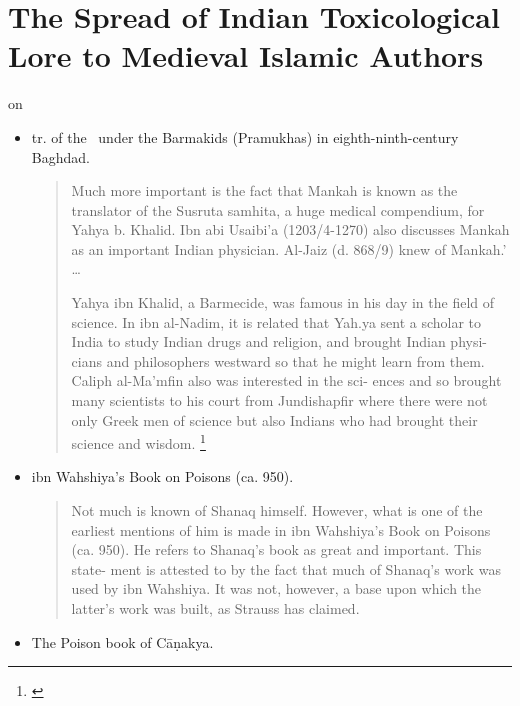 \section{The Spread of Indian Toxicological Lore to Medieval Islamic 
Authors}

\citet[Introduction]{leve-1966} on 
\begin{itemize}
    \item tr. of the \SS\ under the Barmakids (Pramukhas) in 
    eighth-ninth-century Baghdad.
    \begin{quote}
        Much more important is the fact
        that Mankah is known as the translator of the Susruta
        samhita, a huge medical compendium, for Yahya b.
        Khalid. Ibn abi Usaibi'a (1203/4-1270) also discusses
        Mankah as an important Indian physician. Al-Jaiz
        (d. 868/9) knew of Mankah.'
        \ldots
        
        Yahya ibn Khalid, a Barmecide, was famous in his
        day in the field of science. In ibn al-Nadim, it is
        related that Yah.ya sent a scholar to India to study
        Indian drugs and religion, and brought Indian physi-
        cians and philosophers westward so that he might learn
        from them.
        Caliph al-Ma'mfin  also was interested in the sci-
        ences and so brought many scientists to his court from
        Jundishapfir where there were not only Greek men of
        science but also Indians who had brought their science
        and wisdom.
        \footnote{\cite[6]{leve-1966}}
    \end{quote}
    
    \item ibn Wahshiya's Book on Poisons (ca. 950). 
    \begin{quote}
        Not much is known of Shanaq himself. However,
        what is one of the earliest mentions of him is made in
        ibn Wahshiya's Book on Poisons (ca. 950). He refers
        to Shanaq's book as great and important. This state-
        ment is attested to by the fact that much of Shanaq's
        work was used by ibn Wahshiya. It was not, however,
        a base upon which the latter's work was built, as
        Strauss has claimed.
    \end{quote}
    \item The Poison book of Cāṇakya. 
\end{itemize}
